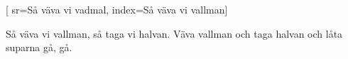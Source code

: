[
		sr={Så väva vi vadmal},
		index={Så väva vi vallman}]
					
\beginverse*						
Så väva vi vallman,
så taga vi halvan.
Väva vallman och taga halvan
och låta suparna gå, gå.
\endverse		
\endsong